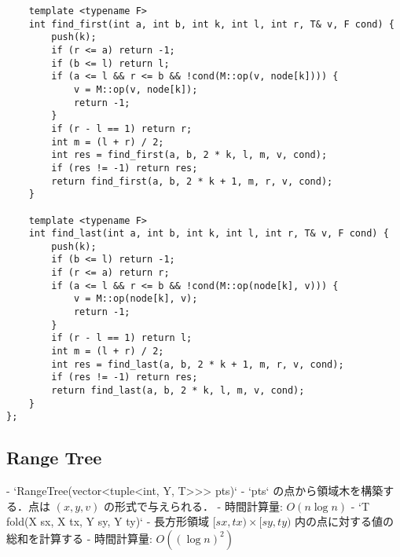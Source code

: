 \begin{lstlisting}
    template <typename F>
    int find_first(int a, int b, int k, int l, int r, T& v, F cond) {
        push(k);
        if (r <= a) return -1;
        if (b <= l) return l;
        if (a <= l && r <= b && !cond(M::op(v, node[k]))) {
            v = M::op(v, node[k]);
            return -1;
        }
        if (r - l == 1) return r;
        int m = (l + r) / 2;
        int res = find_first(a, b, 2 * k, l, m, v, cond);
        if (res != -1) return res;
        return find_first(a, b, 2 * k + 1, m, r, v, cond);
    }

    template <typename F>
    int find_last(int a, int b, int k, int l, int r, T& v, F cond) {
        push(k);
        if (b <= l) return -1;
        if (r <= a) return r;
        if (a <= l && r <= b && !cond(M::op(node[k], v))) {
            v = M::op(node[k], v);
            return -1;
        }
        if (r - l == 1) return l;
        int m = (l + r) / 2;
        int res = find_last(a, b, 2 * k + 1, m, r, v, cond);
        if (res != -1) return res;
        return find_last(a, b, 2 * k, l, m, v, cond);
    }
};
\end{lstlisting}


\subsection{Range Tree}

\begin{small}
\begin{markdown}
- `RangeTree(vector<tuple<int, Y, T>>> pts)`
    - `pts` の点から領域木を構築する．点は $(x, y, v)$ の形式で与えられる．
    - 時間計算量: $O(n\log n)$
- `T fold(X sx, X tx, Y sy, Y ty)`
    - 長方形領域 $[sx, tx) \times [sy, ty)$ 内の点に対する値の総和を計算する
    - 時間計算量: $O((\log n)^2)$

\end{markdown}
\end{small}

